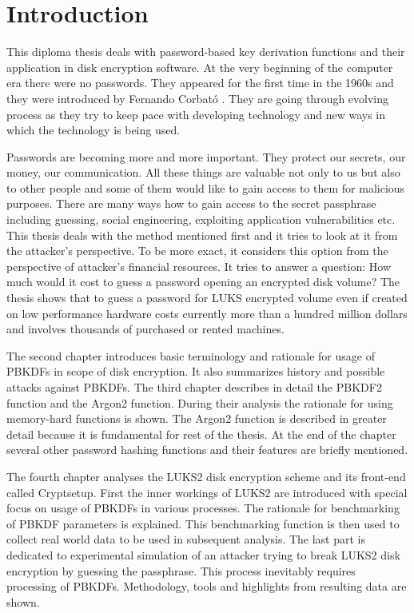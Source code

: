 \documentclass[nolof]{fithesis3}
\begin{document}
\chapter{Introduction}
This diploma thesis deals with password-based key derivation functions and their application in disk encryption software. At the very beginning of the computer era there were no passwords. They appeared for the first time in the 1960s and they were introduced by Fernando Corbató \parencite{ctss}. They are going through evolving process as they try to keep pace with developing technology and new ways in which the technology is being used.

Passwords are becoming more and more important. They protect our secrets, our money, our communication. All these things are valuable not only to us but also to other people and some of them would like to gain access to them for malicious purposes. There are many ways how to gain access to the secret passphrase including guessing, social engineering, exploiting application vulnerabilities etc. This thesis deals with the method mentioned first and it tries to look at it from the attacker's perspective. To be more exact, it considers this option from the perspective of attacker's financial resources. It tries to answer a question: How much would it cost to guess a password opening an encrypted disk volume? The thesis shows that to guess a password for LUKS encrypted volume even if created on low performance hardware costs currently more than a hundred million dollars and involves thousands of purchased or rented machines.

The second chapter introduces basic terminology and rationale for usage of PBKDFs in scope of disk encryption. It also summarizes history and possible attacks against PBKDFs. The third chapter describes in detail the PBKDF2 function and the Argon2 function. During their analysis the rationale for using memory-hard functions is shown. The Argon2 function is described in greater detail because it is fundamental for rest of the thesis. At the end of the chapter several other password hashing functions and their features are briefly mentioned.

The fourth chapter analyses the LUKS2 disk encryption scheme and its front-end called Cryptsetup. First the inner workings of LUKS2 are introduced with special focus on usage of PBKDFs in various processes. The rationale for benchmarking of PBKDF parameters is explained. This benchmarking function is then used to collect real world data to be used in subsequent analysis. The last part is dedicated to experimental simulation of an attacker trying to break LUKS2 disk encryption by guessing the passphrase. This process inevitably requires processing of PBKDFs. Methodology, tools and highlights from resulting data are shown.
\end{document}
